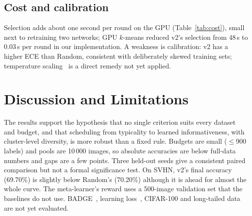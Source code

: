 \documentclass[conference,a4paper]{IEEEtran}
\begin{document}
\subsection{Cost and calibration}
Selection adds about one second per round on the GPU (Table~\ref{tab:cost}), small next to retraining two networks;
GPU $k$-means reduced v2's selection from 48\,s to 0.03\,s per round in our implementation. A weakness is calibration:
v2 has a higher ECE than Random, consistent with deliberately skewed training sets; temperature
scaling~\cite{guo2017} is a direct remedy not yet applied.

\begin{table}[t]
\caption{Mean selection time per round (s) and mean final ECE.}
\label{tab:cost}
\centering\footnotesize
{}
\end{table}

\section{Discussion and Limitations}
The results support the hypothesis that no single criterion suits every dataset and budget, and that scheduling from
typicality to learned informativeness, with cluster-level diversity, is more robust than a fixed rule. Budgets are
small ($\le$900 labels) and pools are 10\,000 images, so absolute accuracies are below full-data numbers and gaps are
a few points. Three held-out seeds give a consistent paired comparison but not a formal significance test. On SVHN,
v2's final accuracy (69.70\%) is slightly below Random's (70.20\%) although it is
ahead for almost the whole curve. The meta-learner's reward uses a 500-image validation set that the baselines do not
use. BADGE~\cite{ash2020}, learning loss~\cite{yoo2019}, CIFAR-100 and long-tailed data are not yet evaluated.
\end{document}
